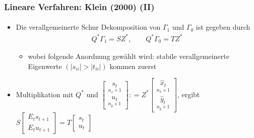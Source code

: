 \documentclass[10pt]{beamer}  %
\begin{document}
\begin{frame}
\frametitle{Lineare Verfahren: Klein (2000) (II)}\framesubtitle{}
\begin{itemize}
\item Die verallgemeinerte Schur Dekomposition von $\Gamma_1$ und $\Gamma_0$ ist gegeben durch
\begin{align*}
  Q^* \Gamma_1 = S Z^*,\qquad   Q^* \Gamma_0 = T Z^*
\end{align*}
\begin{itemize}
\item wobei folgende Anordnung gew\"{a}hlt wird: stabile verallgemeinerte Eigenwerte $(|s_{ii}|>|t_{ii}|)$ kommen zuerst
\end{itemize}
\item Multiplikation mit $Q^*$ und
$\begin{bmatrix} \underset{n_x \times 1}{s_t} \\ \underset{n_y\times1}{u_t} \end{bmatrix} : = Z^* \begin{bmatrix} \underset{n_x \times 1}{\widehat{x}_t} \\ \underset{n_y \times 1}{\widehat{y}_t} \end{bmatrix}$, ergibt
$
  S  \begin{bmatrix} E_t s_{t+1}\\ E_t u_{t+1} \end{bmatrix} = T \begin{bmatrix} s_t \\ u_t \end{bmatrix}
$
\end{itemize}
\end{frame}
\end{document}
